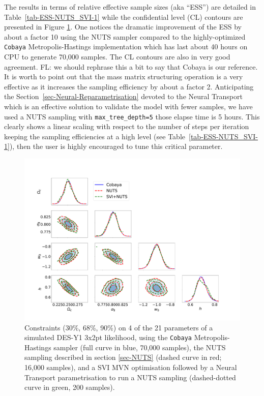 \documentclass[twocolumn,twocolappendix,nofootinbib,iop]{openjournal}
\newcommand{\FrL}[1]{{\color{cyan}FL: #1}}
\begin{document}
The results in terms of relative effective sample sizes (aka ``ESS'') are detailed in Table~\ref{tab-ESS-NUTS_SVI-1} while the confidential level (CL) contours are presented in Figure \ref{fig_cobaya_NUTS_SVI}. One notices the dramatic improvement of the ESS by about a factor 10 using the NUTS sampler compared to the highly-optimized \texttt{Cobaya} Metropolis-Hastings implementation \citep{2019ascl.soft10019T,2021JCAP...05..057T} which has last about 40 hours on CPU to generate 70,000 samples. The CL contours are also in very good agreement. \FrL{we should rephrase this a bit to say that Cobaya is our reference.} It is worth to point out that the mass matrix structuring operation is a very effective as it increases the sampling efficiency by about a factor 2.   Anticipating the Section~\ref{sec-Neural-Reparametrisation} devoted to the Neural Transport which is an effective solution to validate the model with fewer samples, we have used a NUTS sampling with \texttt{max\_tree\_depth=5} those elapse time is 5 hours. This clearly shows a linear scaling with respect to the number of steps per iteration keeping the sampling efficiencies at a high level (see Table~\ref{tab-ESS-NUTS_SVI-1}), then the user is highly encouraged to tune this critical parameter. 
%
\begin{figure}
\centering
\includegraphics[width=1.5\columnwidth]{figures/fig_Cobaya-NUTS-SVI200_v1.pdf}
\caption{Constraints (30\%, 68\%, 90\%) on 4 of the 21 parameters of a simulated DES-Y1 3x2pt likelihood, using the \texttt{Cobaya} Metropolis-Hastings sampler (full curve in blue, 70,000 samples), the  NUTS sampling described in section \ref{sec-NUTS} (dashed curve in red; 16,000 samples), and a SVI MVN optimisation followed by a Neural Transport parametrisation to run a NUTS sampling (dashed-dotted curve in green, 200 samples).}
\label{fig_cobaya_NUTS_SVI}
\end{figure}
\end{document}
